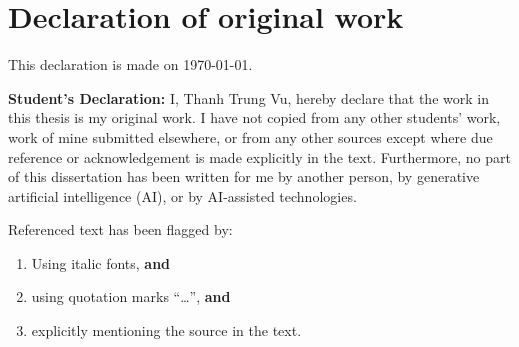\chapter*{Declaration of original work}
\begin{flushright}
This declaration is made on \today.
\end{flushright}


{\bf Student's Declaration:}
I, Thanh Trung Vu, hereby declare that the work in this thesis 
is my original work. I have not copied from any other students' work, 
work of mine submitted elsewhere,  or from any other sources except where due 
reference or acknowledgement is made explicitly in the text. 
Furthermore, no part of this dissertation has been written for me by another person,
by generative artificial intelligence (AI), or by AI-assisted technologies.  
 



Referenced text has been flagged by:
\begin{enumerate}
\item Using italic fonts, {\bf and} %
\item using quotation marks ``\ldots'', {\bf and}
\item explicitly mentioning the source in the text.
\end{enumerate}

